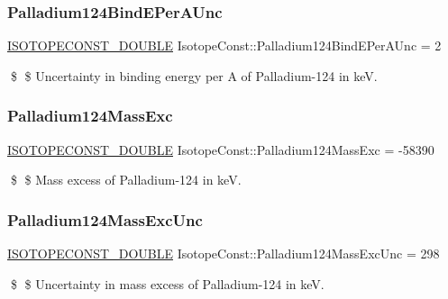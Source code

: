 \subsubsection{\texorpdfstring{Palladium124\+Bind\+E\+Per\+A\+Unc}{Palladium124BindEPerAUnc}}
{\footnotesize\ttfamily \mbox{\hyperlink{group___isotope_const-_macros_ga8f45a7272ce02c0b4c65c44636ed719a}{I\+S\+O\+T\+O\+P\+E\+C\+O\+N\+S\+T\+\_\+\+D\+O\+U\+B\+LE}} Isotope\+Const\+::\+Palladium124\+Bind\+E\+Per\+A\+Unc = 2}

\$ \$ Uncertainty in binding energy per A of Palladium-\/124 in keV. \mbox{\label{group___isotope_const-_palladium-_pd124_ga7290f746d6e1420efc0470afc3383f53}} 
\subsubsection{\texorpdfstring{Palladium124\+Mass\+Exc}{Palladium124MassExc}}
{\footnotesize\ttfamily \mbox{\hyperlink{group___isotope_const-_macros_ga8f45a7272ce02c0b4c65c44636ed719a}{I\+S\+O\+T\+O\+P\+E\+C\+O\+N\+S\+T\+\_\+\+D\+O\+U\+B\+LE}} Isotope\+Const\+::\+Palladium124\+Mass\+Exc = -\/58390}

\$ \$ Mass excess of Palladium-\/124 in keV. \mbox{\label{group___isotope_const-_palladium-_pd124_gac7f52b9bd4746f4c5191ee46a3535931}} 
\subsubsection{\texorpdfstring{Palladium124\+Mass\+Exc\+Unc}{Palladium124MassExcUnc}}
{\footnotesize\ttfamily \mbox{\hyperlink{group___isotope_const-_macros_ga8f45a7272ce02c0b4c65c44636ed719a}{I\+S\+O\+T\+O\+P\+E\+C\+O\+N\+S\+T\+\_\+\+D\+O\+U\+B\+LE}} Isotope\+Const\+::\+Palladium124\+Mass\+Exc\+Unc = 298}

\$ \$ Uncertainty in mass excess of Palladium-\/124 in keV. \mbox{\label{group___isotope_const-_palladium-_pd124_ga57e3466497323b29e417bb683325ae91}} 

